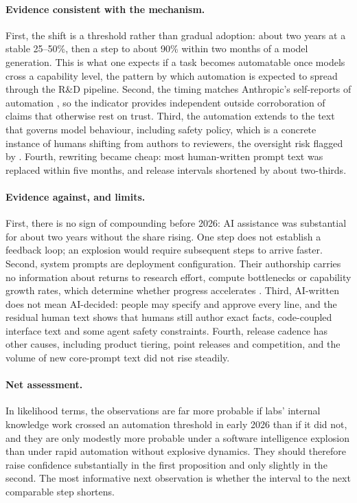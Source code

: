 \documentclass[11pt]{article}
\begin{document}
\paragraph{Evidence consistent with the mechanism.} First, the shift is a threshold rather than gradual adoption: about two years at a stable 25--50\%, then a step to about 90\% within two months of a model generation. This is what one expects if a task becomes automatable once models cross a capability level, the pattern by which automation is expected to spread through the R\&D pipeline. Second, the timing matches Anthropic's self-reports of automation \citep{favaro2026builds,favaro2026measurements}, so the indicator provides independent outside corroboration of claims that otherwise rest on trust. Third, the automation extends to the text that governs model behaviour, including safety policy, which is a concrete instance of humans shifting from authors to reviewers, the oversight risk flagged by \citet{chan2026explosion}. Fourth, rewriting became cheap: most human-written prompt text was replaced within five months, and release intervals shortened by about two-thirds.

\paragraph{Evidence against, and limits.} First, there is no sign of compounding before 2026: AI assistance was substantial for about two years without the share rising. One step does not establish a feedback loop; an explosion would require subsequent steps to arrive faster. Second, system prompts are deployment configuration. Their authorship carries no information about returns to research effort, compute bottlenecks or capability growth rates, which determine whether progress accelerates \citep{eth2025sie,whitfill2025compute,ho2025sie}. Third, AI-written does not mean AI-decided: people may specify and approve every line, and the residual human text shows that humans still author exact facts, code-coupled interface text and some agent safety constraints. Fourth, release cadence has other causes, including product tiering, point releases and competition, and the volume of new core-prompt text did not rise steadily.

\paragraph{Net assessment.} In likelihood terms, the observations are far more probable if labs' internal knowledge work crossed an automation threshold in early 2026 than if it did not, and they are only modestly more probable under a software intelligence explosion than under rapid automation without explosive dynamics. They should therefore raise confidence substantially in the first proposition and only slightly in the second. The most informative next observation is whether the interval to the next comparable step shortens.
\end{document}
